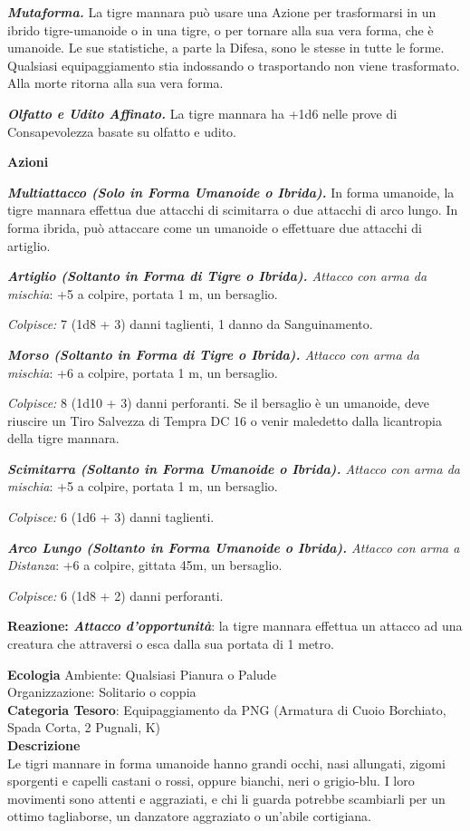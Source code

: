 \begin{multicols}{2}
{\emph{\textbf{Mutaforma.}} La tigre mannara può usare una Azione per trasformarsi in un ibrido tigre-umanoide o in una tigre, o per tornare alla sua vera forma, che è umanoide. Le sue statistiche, a parte la Difesa, sono le stesse in tutte le forme. Qualsiasi equipaggiamento stia indossando o trasportando non viene trasformato. Alla morte ritorna alla sua vera forma.

\emph{\textbf{Olfatto e Udito Affinato.}} La tigre mannara ha +1d6 nelle prove di Consapevolezza basate su olfatto e udito.

\textbf{Azioni}

\emph{\textbf{Multiattacco (Solo in Forma Umanoide o Ibrida).}} In forma umanoide, la tigre mannara effettua due attacchi di scimitarra o due attacchi di arco lungo. In forma ibrida, può attaccare come un umanoide o effettuare due attacchi di artiglio.

\emph{\textbf{Artiglio (Soltanto in Forma di Tigre o Ibrida).} Attacco con arma da mischia}: +5 a colpire, portata 1 m, un bersaglio.

\emph{Colpisce:} 7 (1d8 + 3) danni taglienti, 1 danno da Sanguinamento.

\emph{\textbf{Morso (Soltanto in Forma di Tigre o Ibrida).} Attacco con arma da mischia}: +6 a colpire, portata 1 m, un bersaglio.

\emph{Colpisce:} 8 (1d10 + 3) danni perforanti. Se il bersaglio è un umanoide, deve riuscire un Tiro Salvezza di Tempra DC 16 o venir maledetto dalla licantropia della tigre mannara.

\emph{\textbf{Scimitarra (Soltanto in Forma Umanoide o Ibrida).} Attacco con arma da mischia}: +5 a colpire, portata 1 m, un bersaglio.

\emph{Colpisce:} 6 (1d6 + 3) danni taglienti.

\emph{\textbf{Arco Lungo (Soltanto in Forma Umanoide o Ibrida).} Attacco con arma a Distanza}: +6 a colpire, gittata 45m, un bersaglio.

\emph{Colpisce:} 6 (1d8 + 2) danni perforanti.

\textbf{Reazione: \emph{Attacco d'opportunità}}: la tigre mannara effettua un attacco ad una creatura che attraversi o esca dalla sua portata di 1 metro.

\textbf{Ecologia}
Ambiente: Qualsiasi Pianura o Palude\\
Organizzazione: Solitario o coppia\\
\textbf{Categoria Tesoro}: Equipaggiamento da PNG (Armatura di Cuoio Borchiato, Spada Corta, 2 Pugnali, K)\\
\textbf{Descrizione}\\
Le tigri mannare in forma umanoide hanno grandi occhi, nasi allungati, zigomi sporgenti e capelli castani o rossi, oppure bianchi, neri o grigio-blu. I loro movimenti sono attenti e aggraziati, e chi li guarda potrebbe scambiarli per un ottimo tagliaborse, un danzatore aggraziato o un'abile cortigiana.

}
\end{multicols}
